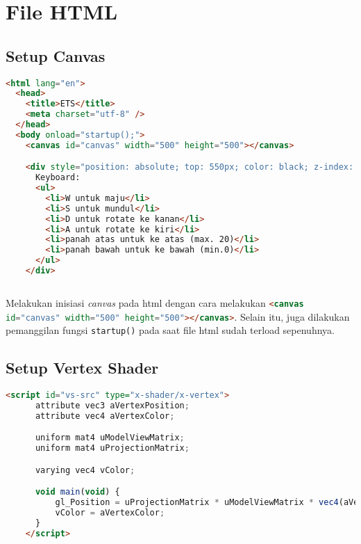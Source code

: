 \section{File HTML}

\subsection*{Setup Canvas}

\begin{lstlisting}[language=html, label={lst: indexHtml}, caption={file index.html}]
<html lang="en">
  <head>
    <title>ETS</title>
    <meta charset="utf-8" />
  </head>
  <body onload="startup();">
    <canvas id="canvas" width="500" height="500"></canvas>

    <div style="position: absolute; top: 550px; color: black; z-index: 10">
      Keyboard:
      <ul>
        <li>W untuk maju</li>
        <li>S untuk mundul</li>
        <li>D untuk rotate ke kanan</li>
        <li>A untuk rotate ke kiri</li>
        <li>panah atas untuk ke atas (max. 20)</li>
        <li>panah bawah untuk ke bawah (min.0)</li>
      </ul>
    </div>
    
\end{lstlisting}

Melakukan inisiasi \textit{canvas} pada html dengan cara melakukan \lstinline[language=html]{<canvas id="canvas" width="500" height="500"></canvas>}. Selain itu, juga dilakukan pemanggilan fungsi \texttt{startup()} pada saat file html sudah terload sepenuhnya.

\subsection*{Setup Vertex Shader}

\begin{lstlisting}[language=html, label={lst: vertexShader}, caption={file vertexShader}]
    <script id="vs-src" type="x-shader/x-vertex">
      attribute vec3 aVertexPosition;
      attribute vec4 aVertexColor;

      uniform mat4 uModelViewMatrix;
      uniform mat4 uProjectionMatrix;

      varying vec4 vColor;

      void main(void) {
          gl_Position = uProjectionMatrix * uModelViewMatrix * vec4(aVertexPosition, 1.0);
          vColor = aVertexColor;
      }
    </script>

\end{lstlisting}

